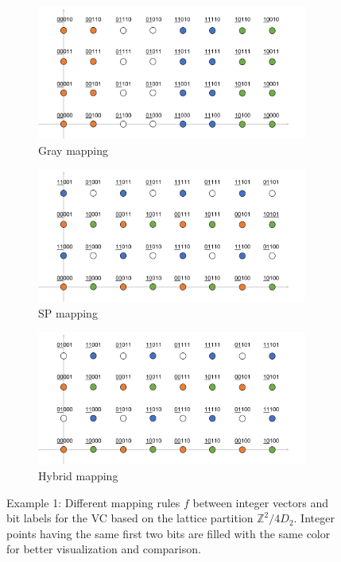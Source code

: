 \documentclass[journal]{IEEEtran}
\newcommand{\Z}{\mathbb{Z}}
\begin{document}
\begin{figure}[tbp]
\centering
\begin{subfigure}{\linewidth}
    \centering
    \includegraphics[width=3.5in]{figures/labeling1.png}
    \caption{Gray mapping}
    \label{Fig:labeling1}
    \end{subfigure}
    \begin{subfigure}{\linewidth}
        \centering
        \includegraphics[width=3.5in]{figures/labeling2.png}%
        \caption{SP mapping}
        \label{Fig:labeling2}
    \end{subfigure}
    \begin{subfigure}{\linewidth}
        \centering
        \includegraphics[width=3.5in]{figures/labeling3.png}%
        \caption{Hybrid mapping}
        \label{Fig:labeling3}
    \end{subfigure}
    \caption{Example 1: Different mapping rules $f$ between integer vectors and bit labels for the VC based on the lattice partition $\Z^2/4D_2$. Integer points having the same first two bits are filled with the same color for better visualization and comparison.}
    \label{Fig:labeling}
\end{figure}
\end{document}
